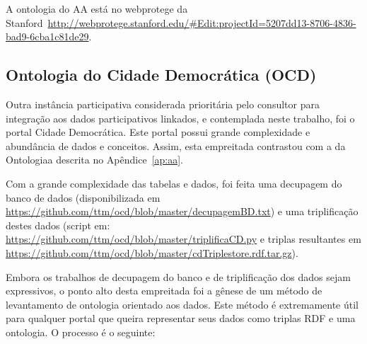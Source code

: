 \documentclass[12pt]{article}
\begin{document}
A ontologia do AA está no webprotege da Stanford~\url{http://webprotege.stanford.edu/#Edit:projectId=5207dd13-8706-4836-bad9-6cba1c81de29}.

\subsection{Ontologia do Cidade Democrática (OCD)}
Outra instância participativa considerada prioritária pelo consultor para integração aos dados participativos linkados, e contemplada neste trabalho, foi o portal Cidade Democrática. Este portal possui grande complexidade e abundância de dados e conceitos. Assim, esta empreitada contrastou com a da Ontologiaa descrita no Apêndice~\ref{ap:aa}.

Com a grande complexidade das tabelas e dados, foi feita uma decupagem do banco de dados (disponibilizada em \url{https://github.com/ttm/ocd/blob/master/decupagemBD.txt}) e uma triplificação destes dados (script em: \url{https://github.com/ttm/ocd/blob/master/triplificaCD.py} e triplas resultantes em \url{https://github.com/ttm/ocd/blob/master/cdTriplestore.rdf.tar.gz}).

Embora os trabalhos de decupagem do banco e de triplificação dos dados sejam expressivos, o ponto alto desta empreitada foi a gênese de um método de levantamento de ontologia orientado aos dados. Este método é extremamente útil para qualquer portal que queira representar seus dados como triplas RDF e uma ontologia. O processo é o seguinte:
\end{document}
